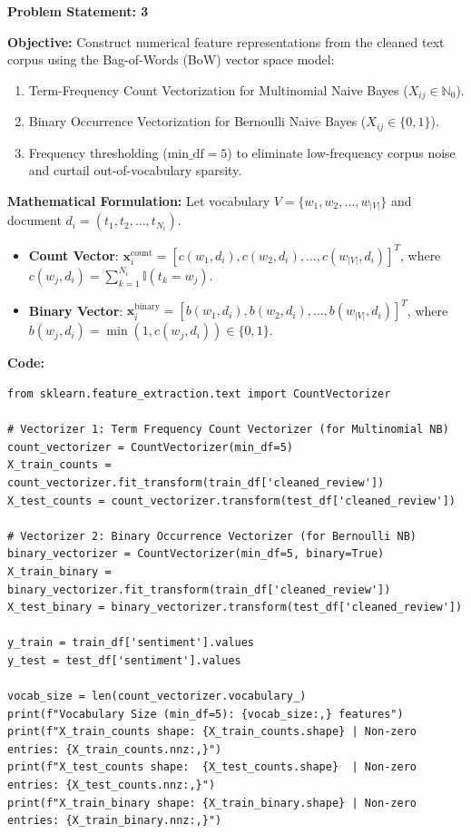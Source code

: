 \documentclass[12pt]{article}
\begin{document}
\textbf{Problem Statement: 3}

\textbf{Objective:} Construct numerical feature representations from the cleaned text corpus using the Bag-of-Words (BoW) vector space model:
\begin{enumerate}
    \item Term-Frequency Count Vectorization for Multinomial Naive Bayes ($X_{ij} \in \mathbb{N}_0$).
    \item Binary Occurrence Vectorization for Bernoulli Naive Bayes ($X_{ij} \in \{0, 1\}$).
    \item Frequency thresholding ($\text{min\_df}=5$) to eliminate low-frequency corpus noise and curtail out-of-vocabulary sparsity.
\end{enumerate}

\vspace{0.2cm}
\textbf{Mathematical Formulation:}
Let vocabulary $V = \{w_1, w_2, \dots, w_{|V|}\}$ and document $d_i = (t_1, t_2, \dots, t_{N_i})$.
\begin{itemize}
    \item \textbf{Count Vector}: $\mathbf{x}_i^{\text{count}} = [c(w_1, d_i), c(w_2, d_i), \dots, c(w_{|V|}, d_i)]^T$, where $c(w_j, d_i) = \sum_{k=1}^{N_i} \mathbb{I}(t_k = w_j)$.
    \item \textbf{Binary Vector}: $\mathbf{x}_i^{\text{binary}} = [b(w_1, d_i), b(w_2, d_i), \dots, b(w_{|V|}, d_i)]^T$, where $b(w_j, d_i) = \min(1, c(w_j, d_i)) \in \{0, 1\}$.
\end{itemize}

\textbf{Code:}

\begin{lstlisting}[style=code]
from sklearn.feature_extraction.text import CountVectorizer

# Vectorizer 1: Term Frequency Count Vectorizer (for Multinomial NB)
count_vectorizer = CountVectorizer(min_df=5)
X_train_counts = count_vectorizer.fit_transform(train_df['cleaned_review'])
X_test_counts = count_vectorizer.transform(test_df['cleaned_review'])

# Vectorizer 2: Binary Occurrence Vectorizer (for Bernoulli NB)
binary_vectorizer = CountVectorizer(min_df=5, binary=True)
X_train_binary = binary_vectorizer.fit_transform(train_df['cleaned_review'])
X_test_binary = binary_vectorizer.transform(test_df['cleaned_review'])

y_train = train_df['sentiment'].values
y_test = test_df['sentiment'].values

vocab_size = len(count_vectorizer.vocabulary_)
print(f"Vocabulary Size (min_df=5): {vocab_size:,} features")
print(f"X_train_counts shape: {X_train_counts.shape} | Non-zero entries: {X_train_counts.nnz:,}")
print(f"X_test_counts shape:  {X_test_counts.shape}  | Non-zero entries: {X_test_counts.nnz:,}")
print(f"X_train_binary shape: {X_train_binary.shape} | Non-zero entries: {X_train_binary.nnz:,}")
\end{lstlisting}
\end{document}
